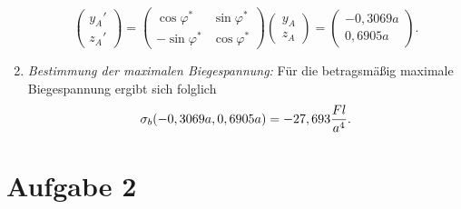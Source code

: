 \documentclass{exercise}
\begin{document}
\begin{enumerate}[label=\arabic*)]
\[\begin{pmatrix}
                y_A'\\
                z_A'
            \end{pmatrix} = \begin{pmatrix}
                \cos\varphi^* & \sin\varphi^*\\
                -\sin\varphi^* & \cos\varphi^*
            \end{pmatrix}\begin{pmatrix}
                y_A\\
                z_A
            \end{pmatrix} = \begin{pmatrix}
                -0,3069a\\
                0,6905a
            \end{pmatrix}.
        \]
        \item \emph{Bestimmung der maximalen Biegespannung:} Für die betragsmäßig maximale Biegespannung ergibt sich folglich
        \[
            \sigma_b\parentheses*{-0,3069a, 0,6905a} = -27,693\frac{Fl}{a^4}.
        \]
    \end{enumerate}


    \section*{Aufgabe 2}
    
\end{document}
